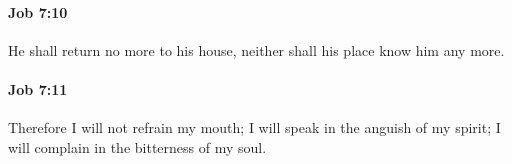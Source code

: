 		\paragraph{Job 7:10} %
			\label{JOB-7-10}

			He shall return no more to his house, neither shall his place know him any more.


		\paragraph{Job 7:11} %
			\label{JOB-7-11}

			Therefore I will not refrain my mouth; I will speak in the anguish of my spirit; I will complain in the bitterness of my soul.


